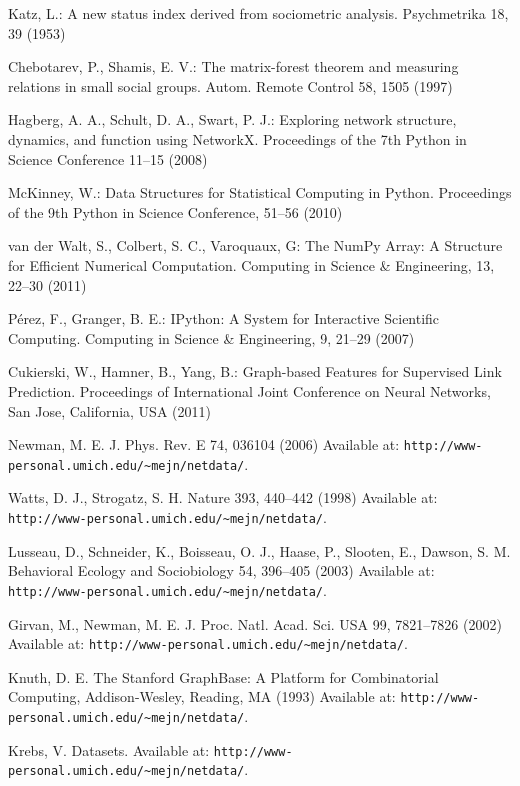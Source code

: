 \documentclass{llncs}
\begin{document}
\begin{thebibliography}{28}
Katz, L.:
A new status index derived from sociometric analysis.
Psychmetrika 18, 39 (1953)

Chebotarev, P., Shamis, E. V.:
The matrix-forest theorem and measuring relations in small social groups.
Autom. Remote Control 58, 1505 (1997)

Hagberg, A. A., Schult, D. A., Swart, P. J.: 
Exploring network structure, dynamics, and function using NetworkX.
Proceedings of the 7th Python in Science Conference 11--15 (2008)

McKinney, W.:
Data Structures for Statistical Computing in Python.
Proceedings of the 9th Python in Science Conference, 51--56 (2010)

van der Walt, S., Colbert, S. C., Varoquaux, G:
The NumPy Array: A Structure for Efficient Numerical Computation.
Computing in Science \& Engineering, 13, 22--30 (2011)

P{\'e}rez, F., Granger, B. E.:
IPython: A System for Interactive Scientific Computing.
Computing in Science \& Engineering, 9, 21--29 (2007)

Cukierski, W., Hamner, B., Yang, B.:
Graph-based Features for Supervised Link Prediction.
Proceedings of International Joint Conference on Neural Networks, San Jose, California, USA (2011)

Newman, M. E. J.
Phys. Rev. E 74, 036104 (2006)
Available at: \texttt{http://www-personal.umich.edu/\~{}mejn/netdata/}.

Watts, D. J., Strogatz, S. H.
Nature 393, 440--442 (1998) 
Available at: \texttt{http://www-personal.umich.edu/\~{}mejn/netdata/}.

Lusseau, D., Schneider, K., Boisseau, O. J., Haase, P., Slooten, E., Dawson, S. M.
Behavioral Ecology and Sociobiology 54, 396--405 (2003)
Available at: \texttt{http://www-personal.umich.edu/\~{}mejn/netdata/}.

Girvan, M., Newman, M. E. J.
Proc. Natl. Acad. Sci. USA 99, 7821--7826 (2002)
Available at: \texttt{http://www-personal.umich.edu/\~{}mejn/netdata/}.

Knuth, D. E.
The Stanford GraphBase: A Platform for Combinatorial Computing, Addison-Wesley, Reading, MA (1993)
Available at: \texttt{http://www-personal.umich.edu/\~{}mejn/netdata/}.

Krebs, V.
Datasets. 
Available at: \texttt{http://www-personal.umich.edu/\~{}mejn/netdata/}.


\end{thebibliography}
\end{document}
